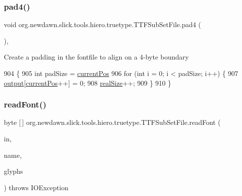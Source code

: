 \subsubsection{\texorpdfstring{pad4()}{pad4()}}
{\footnotesize\ttfamily void org.\+newdawn.\+slick.\+tools.\+hiero.\+truetype.\+T\+T\+F\+Sub\+Set\+File.\+pad4 (\begin{DoxyParamCaption}{ }\end{DoxyParamCaption})\hspace{0.3cm}{\ttfamily [inline]}, {\ttfamily [private]}}

Create a padding in the fontfile to align on a 4-\/byte boundary 
\begin{DoxyCode}
904                         \{
905         \textcolor{keywordtype}{int} padSize = \mbox{\hyperlink{classorg_1_1newdawn_1_1slick_1_1tools_1_1hiero_1_1truetype_1_1_t_t_f_sub_set_file_a5027011db0d9c307afa8de09102eaa10}{currentPos}} %
906         \textcolor{keywordflow}{for} (\textcolor{keywordtype}{int} i = 0; i < padSize; i++) \{
907             \mbox{\hyperlink{classorg_1_1newdawn_1_1slick_1_1tools_1_1hiero_1_1truetype_1_1_t_t_f_sub_set_file_a967f26c7cbd2c428f7ca96c4958edded}{output}}[\mbox{\hyperlink{classorg_1_1newdawn_1_1slick_1_1tools_1_1hiero_1_1truetype_1_1_t_t_f_sub_set_file_a5027011db0d9c307afa8de09102eaa10}{currentPos}}++] = 0;
908             \mbox{\hyperlink{classorg_1_1newdawn_1_1slick_1_1tools_1_1hiero_1_1truetype_1_1_t_t_f_sub_set_file_afbd6781b24988e94a488596aa954ee3c}{realSize}}++;
909         \}
910     \}
\end{DoxyCode}
\mbox{\label{classorg_1_1newdawn_1_1slick_1_1tools_1_1hiero_1_1truetype_1_1_t_t_f_sub_set_file_ad5d399f66e450012f6255ee48945c6ea}} 
\subsubsection{\texorpdfstring{read\+Font()}{readFont()}}
{\footnotesize\ttfamily byte \mbox{[}$\,$\mbox{]} org.\+newdawn.\+slick.\+tools.\+hiero.\+truetype.\+T\+T\+F\+Sub\+Set\+File.\+read\+Font (\begin{DoxyParamCaption}\item[{\mbox{\hyperlink{classorg_1_1newdawn_1_1slick_1_1tools_1_1hiero_1_1truetype_1_1_font_file_reader}{Font\+File\+Reader}}}]{in,  }\item[{String}]{name,  }\item[{Map}]{glyphs }\end{DoxyParamCaption}) throws I\+O\+Exception\hspace{0.3cm}{\ttfamily [inline]}}

